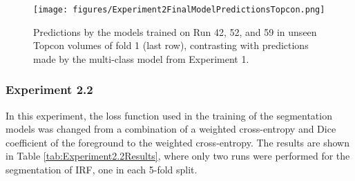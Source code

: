 \begin{figure}[!ht]
	\centering
	\texttt{[image: figures/Experiment2FinalModelPredictionsTopcon.png]}
	\caption{Predictions by the models trained on Run 42, 52, and 59 in unseen Topcon volumes of fold 1 (last row), contrasting with predictions made by the multi-class model from Experiment 1.}
	\label{fig:Experiment2FinalModelPredictionsTopcon}
\end{figure}

\subsubsection{Experiment 2.2}

In this experiment, the loss function used in the training of the segmentation models was changed from a combination of a weighted cross-entropy and Dice coefficient of the foreground to the weighted cross-entropy. The results are shown in Table \ref{tab:Experiment2.2Results}, where only two runs were performed for the segmentation of IRF, one in each 5-fold split. 

